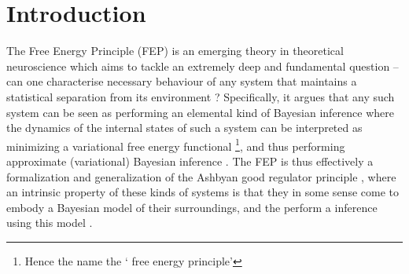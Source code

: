 \chapter{Introduction}
% 
The Free Energy Principle (FEP) \citep{friston2006free,friston2012free,friston2019particularphysics,parr2020Markov} is an emerging theory in theoretical neuroscience which aims to tackle an extremely deep and fundamental question -- can one characterise necessary behaviour of any system that maintains a statistical separation from its environment \citep{parr2020Markov,friston2019particularphysics,bruineberg2020emperor}? Specifically, it argues that any such system can be seen as performing an elemental kind of Bayesian inference where the dynamics of the internal states of such a system can be interpreted as minimizing a variational free energy functional \citep{beal2003variational} \footnote{Hence the name the ` free energy principle'}, and thus performing approximate (variational) Bayesian inference \citep{friston2019particularphysics}. The FEP is thus effectively a formalization and generalization of the Ashbyan good regulator principle \citep{conant1970every}, where an intrinsic property of these kinds of systems is that they in some sense come to embody a Bayesian model of their surroundings, and the perform a inference using this model \citep{baltieri2020predictions}.

